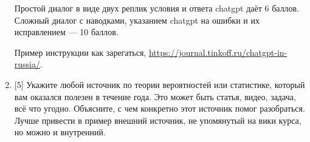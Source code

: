 \documentclass[12pt]{article} %
\begin{document}
\begin{enumerate}
    Простой диалог в виде двух реплик условия и ответа chatgpt даёт 6 баллов. 
    Сложный диалог с наводками, указанием chatgpt на ошибки и их исправлением — 10 баллов. 
 
    Пример инструкции как зарегаться, \url{https://journal.tinkoff.ru/chatgpt-in-russia/}.
 


    \item {[5]} Укажите любой источник по теории вероятностей или статистике, который вам оказался полезен 
    в течение года. 
    Это может быть статья, видео, задача, всё что угодно. Объясните, с чем конкретно этот источник помог 
    разобраться. Лучше привести в пример внешний источник, не упомянутый на вики курса,
    но можно и внутренний. 
    

\end{enumerate}
\end{document}

